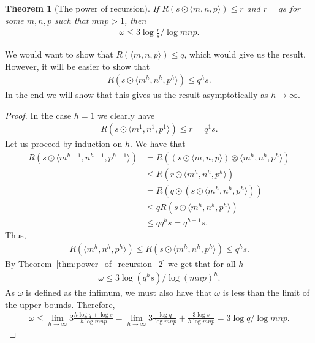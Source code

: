 \documentclass{article}
\theoremstyle{plain}
\newtheorem{theorem}{Theorem}
\theoremstyle{definition}
\theoremstyle{remark}
\begin{document}

\begin{theorem}[The power of recursion]\label{thm:power_of_recursion_3}
If $R(s \odot \langle m, n, p \rangle) \leq r$ and $r = qs$ for some $m, n, p$ such that $mnp > 1$, then
\begin{align*}
    \omega \leq 3 \log \frac{r}{s} / \log mnp.
\end{align*}
\end{theorem}

We would want to show that $R(\langle m, n, p \rangle) \leq q$, which would give us the result. However, it will be easier to show that
\begin{align*}
    R(s \odot \langle m^h, n^h, p^h \rangle) \leq q^h s.
\end{align*}
In the end we will show that this gives us the result asymptotically as $h \to \infty$.

\begin{proof}
In the case $h = 1$ we clearly have
\begin{align*}
    R(s \odot \langle m^1, n^1, p^1 \rangle) \leq r = q^1 s.
\end{align*}
Let us proceed by induction on $h$. We have that
\begin{align*}
    R(s \odot \langle m^{h+1}, n^{h+1}, p^{h+1} \rangle) &= R((s \odot \langle m, n, p \rangle) \otimes \langle m^h, n^h, p^h \rangle) \\
    &\leq R(r \odot \langle m^h, n^h, p^h \rangle) \\
    &= R(q \odot (s \odot \langle m^h, n^h, p^h \rangle)) \\
    &\leq q R(s \odot \langle m^h, n^h, p^h \rangle) \\
    &\leq q q^h s = q^{h+1} s.
\end{align*}
Thus,
\begin{align*}
    R(\langle m^h, n^h, p^h \rangle) \leq R(s \odot \langle m^h, n^h, p^h \rangle) \leq q^h s.
\end{align*}
By Theorem~\ref{thm:power_of_recursion_2} we get that for all $h$
\begin{align*}
    \omega \leq 3 \log (q^h s) / \log (mnp)^h.
\end{align*}
As $\omega$ is defined as the infimum, we must also have that $\omega$ is less than the limit of the upper bounds. Therefore,
\begin{align*}
    \omega \leq \lim_{h \to \infty} 3 \frac{h \log q + \log s}{h \log mnp} = \lim_{h \to \infty} 3 \frac{\log q}{\log mnp} + \frac{3 \log s}{h \log mnp} = 3 \log q / \log mnp. 
\end{align*}
\end{proof}
\end{document}
